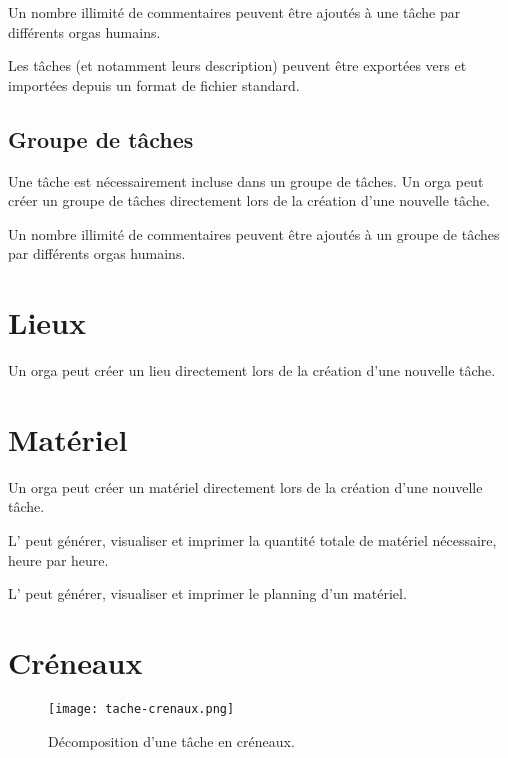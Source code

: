 Un nombre illimité de commentaires peuvent être ajoutés à une tâche par différents orgas humains.


Les tâches (et notamment leurs description) peuvent être exportées vers et importées depuis un format de fichier standard.


\subsection{Groupe de tâches}
Une tâche est nécessairement incluse dans un groupe de tâches.
Un orga peut créer un groupe de tâches directement lors de la création d'une nouvelle tâche.

Un nombre illimité de commentaires peuvent être ajoutés à un groupe de tâches par différents orgas humains.

\section{Lieux}
Un orga peut créer un lieu directement lors de la création d'une nouvelle tâche.



\section{Matériel}

Un orga peut créer un matériel directement lors de la création d'une nouvelle tâche.

L'\oh{} peut générer, visualiser et imprimer la quantité totale de matériel nécessaire, heure par heure.

L'\oh{} peut générer, visualiser et imprimer le planning d'un matériel.

\section{Créneaux}

\begin{figure}[h!t]
\centering
\texttt{[image: tache-crenaux.png]}

\caption{Décomposition d'une tâche en créneaux.}
\label{fig:crenaux}
\end{figure}




